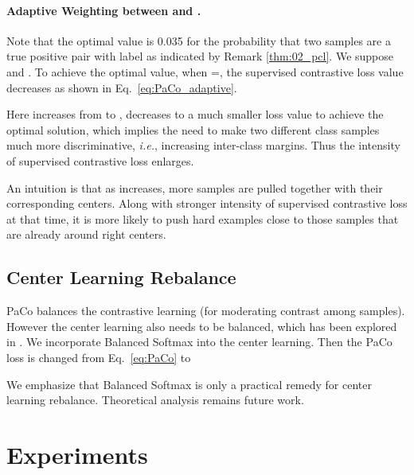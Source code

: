 \documentclass[10pt,twocolumn,letterpaper]{article}
\begin{document}
\paragraph{Adaptive Weighting between  and .} 
Note that the optimal value is 0.035 for the probability that two samples are a true positive pair with label  as indicated by Remark \ref{thm:02_pcl}. We suppose  and   . To achieve the optimal value, when =, the supervised contrastive loss value  decreases as shown in Eq.~\eqref{eq:PaCo_adaptive}.

\begin{figure}[htb!]
	
\end{figure}

Here  increases from  to ,  decreases to a much smaller loss value to achieve the optimal solution, which implies the need to make two different class samples much more discriminative, {\it i.e.}, increasing inter-class margins. Thus the intensity of supervised contrastive loss enlarges.

An intuition is that as  increases, more samples are pulled together with their corresponding centers.
Along with stronger intensity of supervised contrastive loss at that time, it is more likely to push hard examples close to those samples that are already around right centers.

\subsection{Center Learning Rebalance}
PaCo balances the contrastive learning (for moderating contrast among samples). However the center learning also needs to be balanced, which has been explored in \cite{DBLP:journals/nn/BudaMM18,DBLP:conf/cvpr/HuangLLT16,DBLP:conf/cvpr/CuiJLSB19, he2009learning,chawla2002smote, shen2016relay, DBLP:conf/nips/RenYSMZYL20, DBLP:conf/iclr/KangXRYGFK20, DBLP:journals/corr/abs-2010-01809, DBLP:journals/corr/abs-2101-10633, DBLP:conf/nips/TangHZ20,duggal2020elf, Zhong_2021_CVPR}. We incorporate Balanced Softmax \cite{DBLP:conf/nips/RenYSMZYL20} into the center learning. Then the PaCo loss is changed from Eq.~\eqref{eq:PaCo} to


We emphasize that Balanced Softmax is only a practical remedy for center learning rebalance. Theoretical analysis remains future work.


\section{Experiments}
\end{document}
